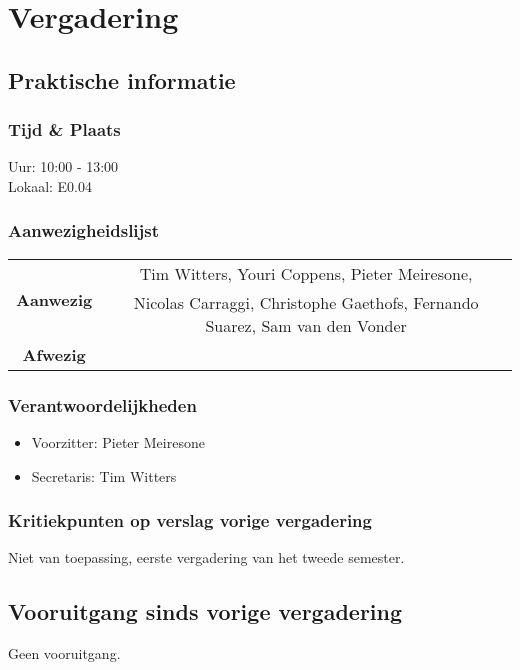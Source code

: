 \section{Vergadering \MeetingDate}
\subsection{Praktische informatie}
\subsubsection{Tijd \& Plaats}
Uur: 10:00 - 13:00
\\
Lokaal: E0.04
\subsubsection{Aanwezigheidslijst}
\begin{table}[htbp]
	\centering
	\begin{tabular}{c|c}
		\multirow{2}{*}{\textbf{Aanwezig}} & Tim Witters, Youri Coppens, Pieter Meiresone, \\
		& Nicolas Carraggi,  Christophe Gaethofs, Fernando Suarez, Sam van den Vonder \\
		\hline
		\textbf{Afwezig} & \\
	\end{tabular}
\end{table}

\subsubsection{Verantwoordelijkheden}
\begin{itemize}
	\item Voorzitter: Pieter Meiresone
	\item Secretaris: Tim Witters
\end{itemize}

\subsubsection{Kritiekpunten op verslag vorige vergadering}
Niet van toepassing, eerste vergadering van het tweede semester.

\subsection{Vooruitgang sinds vorige vergadering} \label{sec:Vooruitgang}
Geen vooruitgang.

